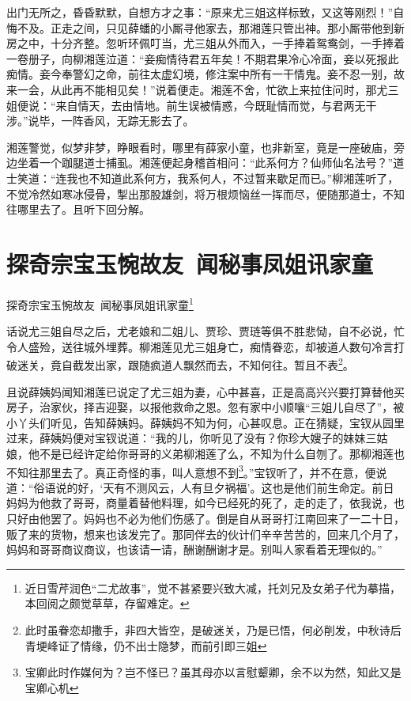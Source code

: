 \documentclass[12pt,oneside]{book}
\begin{document}
出门无所之，昏昏默默，自想方才之事：“原来尤三姐这样标致，又这等刚烈！”自悔不及。正走之间，只见薛蟠的小厮寻他家去，那湘莲只管出神。那小厮带他到新房之中，十分齐整。忽听环佩叮当，尤三姐从外而入，一手捧着鸳鸯剑，一手捧着一卷册子，向柳湘莲泣道：“妾痴情待君五年矣！不期君果冷心冷面，妾以死报此痴情。妾今奉警幻之命，前往太虚幻境，修注案中所有一干情鬼。妾不忍一别，故来一会，从此再不能相见矣！”说着便走。湘莲不舍，忙欲上来拉住问时，那尤三姐便说：“来自情天，去由情地。前生误被情惑，今既耻情而觉，与君两无干涉。”说毕，一阵香风，无踪无影去了。

湘莲警觉，似梦非梦，睁眼看时，哪里有薛家小童，也非新室，竟是一座破庙，旁边坐着一个跏腿道士捕虱。湘莲便起身稽首相问：“此系何方？仙师仙名法号？”道士笑道：“连我也不知道此系何方，我系何人，不过暂来歇足而已。”柳湘莲听了，不觉冷然如寒冰侵骨，掣出那股雄剑，将万根烦恼丝一挥而尽，便随那道士，不知往哪里去了。且听下回分解。



\chapter{探奇宗宝玉惋故友~闻秘事凤姐讯家童}
探奇宗宝玉惋故友~闻秘事凤姐讯家童\footnote{近日雪芹润色“二尤故事”，觉不甚紧要兴致大减，托刘兄及女弟子代为摹描，本回阅之颇觉草草，存留难定。}


话说尤三姐自尽之后，尤老娘和二姐儿、贾珍、贾琏等俱不胜悲恸，自不必说，忙令人盛殓，送往城外埋葬。柳湘莲见尤三姐身亡，痴情眷恋，却被道人数句冷言打破迷关，竟自截发出家，跟随疯道人飘然而去，不知何往。暂且不表\footnote{此时虽眷恋却撒手，非四大皆空，是破迷关，乃是已悟，何必削发，中秋诗后青埂峰证了情缘，仍不出士隐梦，而前引即三姐}。

且说薛姨妈闻知湘莲已说定了尤三姐为妻，心中甚喜，正是高高兴兴要打算替他买房子，治家伙，择吉迎娶，以报他救命之恩。忽有家中小顺嚷“三姐儿自尽了”，被小丫头们听见，告知薛姨妈。薛姨妈不知为何，心甚叹息。正在猜疑，宝钗从园里过来，薛姨妈便对宝钗说道：“我的儿，你听见了没有？你珍大嫂子的妹妹三姑娘，他不是已经许定给你哥哥的义弟柳湘莲了么，不知为什么自刎了。那柳湘莲也不知往那里去了。真正奇怪的事，叫人意想不到\footnote{宝卿此时作媒何为？岂不怪已？虽其母亦以言慰颦卿，余不以为然，知此又是宝卿心机}。”宝钗听了，并不在意，便说道：“俗语说的好，‘天有不测风云，人有旦夕祸福’。这也是他们前生命定。前日妈妈为他救了哥哥，商量着替他料理，如今已经死的死了，走的走了，依我说，也只好由他罢了。妈妈也不必为他们伤感了。倒是自从哥哥打江南回来了一二十日，贩了来的货物，想来也该发完了。那同伴去的伙计们辛辛苦苦的，回来几个月了，妈妈和哥哥商议商议，也该请一请，酬谢酬谢才是。别叫人家看着无理似的。”
\end{document}

